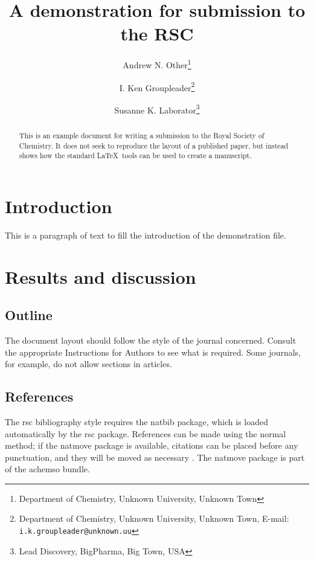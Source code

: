 \documentclass[a4paper]{article}
\author{%
  Andrew N. Other\thanks{%
    Department of Chemistry, Unknown University, Unknown Town%
  }%
  \and
  I. Ken Groupleader\thanks{%
    Department of Chemistry, Unknown University, Unknown Town,
    E-mail: \texttt{i.k.groupleader@unknown.uu}
  }%
  \and
  Susanne K. Laborator\thanks{%
    Lead Discovery, BigPharma, Big Town, USA
  }%
}
\title{A demonstration for submission to the RSC}
\begin{document}
\maketitle

\begin{abstract}
  This is an example document for writing a submission to the
  Royal Society of Chemistry. It does not seek to reproduce the
  layout of a published paper, but instead shows how the standard
  \LaTeX\ tools can be used to create a manuscript.
\end{abstract}

\section{Introduction}
This is a paragraph of text to fill the introduction of the
demonstration file.

\section{Results and discussion}

\subsection{Outline}

The document layout should follow the style of the journal concerned.
Consult the appropriate Instructions for Authors to see what is
required. Some journals, for example, do not allow sections in
articles.

\subsection{References}

The rsc bibliography style requires the \textsf{natbib} package,
which is loaded automatically by the \textsf{rsc} package.
References can be made using the normal method; if the
\textsf{natmove} package is available, citations can be placed
before any punctuation, and they will be moved as necessary
\cite{Mena2000,Abernethy2003}. The \textsf{natmove} package is
part of the \textsf{achemso} bundle.
\end{document}
